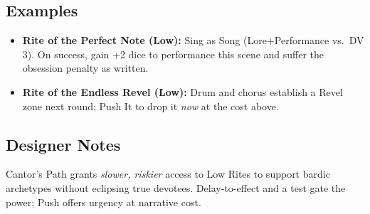 \subsection*{Examples}
\begin{itemize}
\item \textbf{Rite of the Perfect Note (Low):} Sing as Song (Lore+Performance vs.\ DV 3). On success, gain +2 dice to performance this scene and suffer the obsession penalty as written.
\item \textbf{Rite of the Endless Revel (Low):} Drum and chorus establish a Revel zone next round; Push It to drop it \emph{now} at the cost above.
\end{itemize}

\subsection*{Designer Notes}
Cantor’s Path grants \emph{slower, riskier} access to Low Rites to support bardic archetypes without eclipsing true devotees. Delay-to-effect and a test gate the power; Push offers urgency at narrative cost.